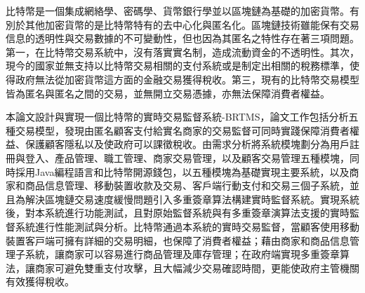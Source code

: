
\begin{cabstract}

	⽐特幣是⼀個集成網絡學、密碼學、貨幣銀⾏學並以區塊鏈為基礎的加密貨幣。有別於其他加密貨幣的是⽐特幣特有的去中⼼化與匿名化。區塊鏈技術雖能保有交易信息的透明性與交易數據的不可變動性，但也因為其匿名之特性存在著三項問題。第一，在⽐特幣交易系統中，沒有落實實名制，造成流動資金的不透明性。其次，現今的國家並無⽀持以⽐特幣交易相關的⽀付系統或是制定出相關的稅務標準，使得政府無法從加密貨幣這⽅⾯的⾦融交易獲得稅收。第三，現有的⽐特幣交易模型皆為匿名與匿名之間的交易，並無開⽴交易憑據，亦無法保障消費者權益。

	本論⽂設計與實現⼀個比特幣的實時交易監督系統-BRTMS，論文工作包括分析五種交易模型，發現由匿名顧客支付給實名商家的交易監督可同時實踐保障消費者權益、保護顧客隱私以及使政府可以課徵稅收。由需求分析將系統模塊劃分為用戶註冊與登入、產品管理、職工管理、商家交易管理，以及顧客交易管理五種模塊，同時採用Java編程語言和比特幣開源錢包，以五種模塊為基礎實現主要系統，以及商家和商品信息管理、移動裝置收款及交易、客戶端行動支付和交易三個子系統，並且為解決區塊鏈交易速度緩慢問題引入多重簽章算法構建實時監督系統。實現系統後，對本系統進行功能測試，且對原始監督系統與有多重簽章演算法支援的實時監督系統進行性能測試與分析。比特幣通過本系統的實時交易監督，當顧客使用移動裝置客⼾端可擁有詳細的交易明細，也保障了消費者權益；藉由商家和商品信息管理子系統，讓商家可以容易進⾏商品管理及庫存管理；在政府端實現多重簽章算法，讓商家可避免雙重⽀付攻擊，且大幅減少交易確認時間，更能使政府主管機關有效獲得稅收。

\end{cabstract}

